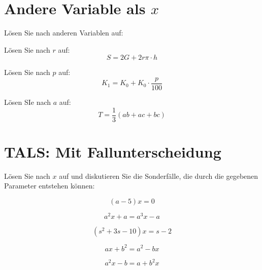 \section{Andere Variable als $x$}
Lösen Sie nach anderen Variablen auf:

\begin{bbwAufgabenBlock}

\item Lösen Sie nach $r$ auf:
 $$S= 2G + 2r\pi\cdot{}h$$

\item
Lösen Sie nach $p$ auf:
$$K_1 = K_0 + K_0 \cdot{}\frac{p}{100}$$

\item Lösen SIe nach $a$ auf:
$$T = \frac13 (ab + ac + bc)$$

\end{bbwAufgabenBlock}
\newpage
\section{TALS: Mit Fallunterscheidung}
Lösen Sie nach $x$ auf und diskutieren Sie die Sonderfälle, die durch
die gegebenen Parameter entstehen können:
\begin{bbwAufgabenBlock}
\item $$(a-5)x = 0$$

\item $$a^2x+a = a^3x - a$$

\item $$(s^2 + 3s - 10)x = s-2$$

\item $$ax+b^2 = a^2 - bx$$

\item $$a^2x-b = a+b^2x$$
\end{bbwAufgabenBlock}
\newpage
